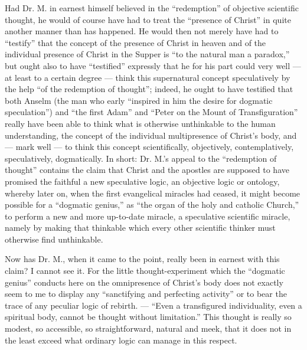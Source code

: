 \documentclass[12pt,a4paper,openany]{book}
\newcommand{\opage}[1]{\marginnote{\footnotesize\textit{[#1]}}}
\begin{document}
Had Dr. M. in earnest himself believed in the ``redemption''
of objective scientific thought, he would of course have
had to treat the ``presence of Christ'' in quite another manner
than has happened. He would then not merely have had to
``testify'' that the concept of the presence of Christ in
heaven and of the individual presence of Christ in the Supper
is ``to the natural man a paradox,'' but ought also to have
``testified'' expressly that he for his part could very well
--- at least to a certain degree --- think this supernatural
concept speculatively by the help ``of the redemption of thought'';
indeed, he ought to have testified that both Anselm (the man
who early
\setcounter{footnote}{0}%
\opage{41}``inspired in him the desire for dogmatic speculation'') and
``the first Adam'' and ``Peter on the Mount of Transfiguration''
really have been able to think what is otherwise unthinkable to
the human understanding, the concept of the individual
multipresence of Christ's body, and --- mark well --- to think
this concept scientifically, objectively, contemplatively,
speculatively, dogmatically. In short: Dr. M.'s appeal to the
``redemption of thought'' contains the claim that Christ and
the apostles are supposed to have promised the faithful a new
speculative logic, an objective logic or ontology, whereby later
on, when the first evangelical miracles had ceased, it might become possible for a ``dogmatic genius,'' as ``the organ of
the holy and catholic Church,'' to perform a new and more
up-to-date miracle, a speculative scientific miracle, namely by
making that thinkable which every other scientific thinker must
otherwise find unthinkable.

Now has Dr. M., when it came to the point, really been
in earnest with this claim? I cannot see it. For the little
thought-experiment which the ``dogmatic genius'' conducts here
on the omnipresence of Christ's body does not exactly seem to
me to display any ``sanctifying and perfecting activity'' or
to bear the trace of any peculiar logic of rebirth.
--- ``Even a transfigured individuality, even a spiritual body,
cannot be thought without limitation.'' This thought is really
so modest, so accessible, so straightforward, natural and meek,
that it does not in the least exceed what ordinary logic can
manage in this respect.
\end{document}
